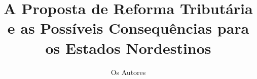 \documentclass{lib/ofb}
\title{A Proposta de Reforma Tributária e as Possíveis Consequências para os Estados Nordestinos}
\author{Os Autores}
\begin{document}
    \imprimircapa
    \imprimirfolhaderosto
    \imprimirsumario
    
    
    
    
    
    
    
    
\end{document}
